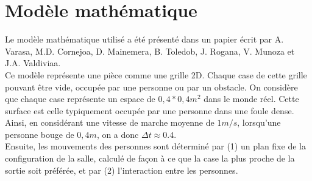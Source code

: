 \section{Modèle mathématique}
	Le modèle mathématique utilisé a été présenté dans un papier écrit par A. Varasa, M.D. Cornejoa, D. Mainemera, B. Toledob, J. Rogana, V. Munoza et J.A. Valdiviaa. \\
	Ce modèle représente une pièce comme une grille 2D. Chaque case de cette grille pouvant être vide, occupée par une personne ou par un obstacle. On considère que chaque case représente un espace de $0,4 * 0,4 m^2$ dans le monde réel. Cette surface est celle typiquement occupée par une personne dans une foule dense. Ainsi, en considérant une vitesse de marche moyenne de $1m/s$, lorsqu'une personne bouge de $0,4m$, on a donc $\Delta t \approx 0.4$.\\
	Ensuite, les mouvements des personnes sont déterminé par (1) un plan fixe de la configuration de la salle, calculé de façon à ce que la case la plus proche de la sortie soit préférée, et par (2) l'interaction entre les personnes.
	
